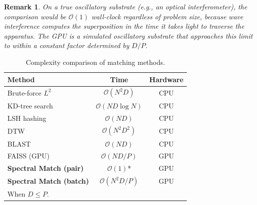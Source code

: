 \documentclass[11pt,twocolumn,a4paper]{article}
\newtheorem{remark}[theorem]{Remark}
\newcommand{\BigO}{\mathcal{O}}
\begin{document}
\begin{remark}
On a true oscillatory substrate (e.g., an optical interferometer), the
comparison would be $\BigO(1)$ wall-clock regardless of problem size,
because wave interference computes the superposition in the time it
takes light to traverse the apparatus. The GPU is a \emph{simulated}
oscillatory substrate that approaches this limit to within a constant
factor determined by $D/P$.
\end{remark}

\begin{table}[t]
\centering
\caption{Complexity comparison of matching methods.}
\label{tab:complexity}
\begin{tabular}{lcc}
\toprule
\textbf{Method} & \textbf{Time} & \textbf{Hardware} \\
\midrule
Brute-force $L^2$ & $\BigO(N^2 D)$ & CPU \\
KD-tree search & $\BigO(ND \log N)$ & CPU \\
LSH hashing \citep{indyk1998} & $\BigO(ND)$ & CPU \\
DTW \citep{sakoe1978} & $\BigO(N^2 D^2)$ & CPU \\
BLAST \citep{altschul1990} & $\BigO(ND)$ & CPU \\
FAISS (GPU) \citep{johnson2019} & $\BigO(ND/P)$ & GPU \\
\textbf{Spectral Match (pair)} & $\BigO(1)$* & GPU \\
\textbf{Spectral Match (batch)} & $\BigO(N^2 D/P)$ & GPU \\
\bottomrule
\multicolumn{3}{l}{\footnotesize *When $D \leq P$.}
\end{tabular}
\end{table}
\end{document}
